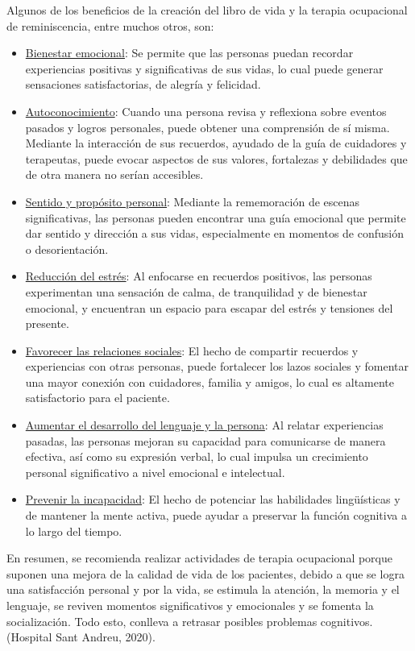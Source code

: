 Algunos de los beneficios de la creación del libro de vida y la terapia ocupacional de reminiscencia, entre muchos otros, son:\\
\begin{itemize}
	\item \underline{Bienestar emocional}: Se permite que las personas puedan recordar experiencias positivas y significativas de sus vidas, lo cual puede generar sensaciones satisfactorias, de alegría y felicidad.\\
	\item \underline{Autoconocimiento}: Cuando una persona revisa y reflexiona sobre eventos pasados y logros personales, puede obtener una comprensión de sí misma. Mediante la interacción de sus recuerdos, ayudado de la guía de cuidadores y terapeutas, puede evocar aspectos de sus valores, fortalezas y debilidades que de otra manera no serían accesibles.
	\item \underline{Sentido y propósito personal}: Mediante la rememoración de escenas significativas, las personas pueden encontrar una guía emocional que permite dar sentido y dirección a sus vidas, especialmente en momentos de confusión o desorientación.
	\item \underline{Reducción del estrés}: Al enfocarse en recuerdos positivos, las personas experimentan una sensación de calma, de tranquilidad y de bienestar emocional, y encuentran un espacio para escapar del estrés y tensiones del presente.
	\item \underline{Favorecer las relaciones sociales}: El hecho de compartir recuerdos y experiencias con otras personas, puede fortalecer los lazos sociales y fomentar una mayor conexión con cuidadores, familia y amigos, lo cual es altamente satisfactorio para el paciente.
	\item \underline{Aumentar el desarrollo del lenguaje y la persona}: Al relatar experiencias pasadas, las personas mejoran su capacidad para comunicarse de manera efectiva, así como su expresión verbal, lo cual impulsa un crecimiento personal significativo a nivel emocional e intelectual.
	\item \underline{Prevenir la incapacidad}: El hecho de potenciar las habilidades lingüísticas y de mantener la mente activa, puede ayudar a preservar la función cognitiva a lo largo del tiempo. 
\end{itemize}



En resumen, se recomienda realizar actividades de terapia ocupacional porque suponen una mejora de la calidad de vida de los pacientes, debido a que se logra una satisfacción personal y por la vida, se estimula la atención, la memoria y el lenguaje, se reviven momentos significativos y emocionales y se fomenta la socialización. Todo esto, conlleva a retrasar posibles problemas cognitivos. (Hospital Sant Andreu, 2020).\\

